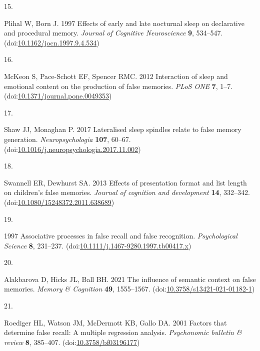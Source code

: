\documentclass[
]{article}
\newlength{\cslhangindent}
\newlength{\csllabelwidth}
\newlength{\cslentryspacingunit} %
\newenvironment{CSLReferences}[2] %
 {%
  \setlength{\parindent}{0pt}
  \ifodd #1
  \let\oldpar\par
  \def\par{\hangindent=\cslhangindent\oldpar}
  \fi
  \setlength{\parskip}{#2\cslentryspacingunit}
 }%
 {}
\newcommand{\CSLLeftMargin}[1]{\parbox[t]{\csllabelwidth}{#1}}
\newcommand{\CSLRightInline}[1]{\parbox[t]{\linewidth - \csllabelwidth}{#1}\break}
\begin{document}
\begin{CSLReferences}{0}{0}
\leavevmode{}%
\CSLLeftMargin{15. }%
\CSLRightInline{Plihal W, Born J. 1997 Effects of early and late nocturnal sleep on declarative and procedural memory. \emph{Journal of Cognitive Neuroscience} \textbf{9}, 534--547. (doi:\href{https://doi.org/10.1162/jocn.1997.9.4.534}{10.1162/jocn.1997.9.4.534})}

\leavevmode{}%
\CSLLeftMargin{16. }%
\CSLRightInline{McKeon S, Pace-Schott EF, Spencer RMC. 2012 Interaction of sleep and emotional content on the production of false memories. \emph{PLoS ONE} \textbf{7}, 1--7. (doi:\href{https://doi.org/10.1371/journal.pone.0049353}{10.1371/journal.pone.0049353})}

\leavevmode{}%
\CSLLeftMargin{17. }%
\CSLRightInline{Shaw JJ, Monaghan P. 2017 Lateralised sleep spindles relate to false memory generation. \emph{Neuropsychologia} \textbf{107}, 60--67. (doi:\href{https://doi.org/10.1016/j.neuropsychologia.2017.11.002}{10.1016/j.neuropsychologia.2017.11.002})}

\leavevmode{}%
\CSLLeftMargin{18. }%
\CSLRightInline{Swannell ER, Dewhurst SA. 2013 Effects of presentation format and list length on children's false memories. \emph{Journal of cognition and development} \textbf{14}, 332--342. (doi:\href{https://doi.org/10.1080/15248372.2011.638689}{10.1080/15248372.2011.638689})}

\leavevmode{}%
\CSLLeftMargin{19. }%
\CSLRightInline{1997 Associative processes in false recall and false recognition. \emph{Psychological Science} \textbf{8}, 231--237. (doi:\href{https://doi.org/10.1111/j.1467-9280.1997.tb00417.x}{10.1111/j.1467-9280.1997.tb00417.x})}

\leavevmode{}%
\CSLLeftMargin{20. }%
\CSLRightInline{Alakbarova D, Hicks JL, Ball BH. 2021 The influence of semantic context on false memories. \emph{Memory \& Cognition} \textbf{49}, 1555--1567. (doi:\href{https://doi.org/10.3758/s13421-021-01182-1}{10.3758/s13421-021-01182-1})}

\leavevmode{}%
\CSLLeftMargin{21. }%
\CSLRightInline{Roediger HL, Watson JM, McDermott KB, Gallo DA. 2001 Factors that determine false recall: A multiple regression analysis. \emph{Psychonomic bulletin \& review} \textbf{8}, 385--407. (doi:\href{https://doi.org/10.3758/bf03196177}{10.3758/bf03196177})}


\end{CSLReferences}
\end{document}
